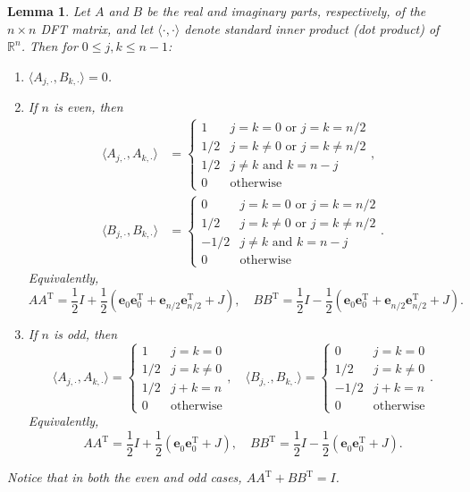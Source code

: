 \documentclass[12pt]{book}
\newcommand{\trans}{\mathrm{T}}	%
\newtheorem{lemma}{Lemma}[section]
\begin{document}
\begin{lemma}
\label{lem:Inner products}
Let $A$ and $B$ be the real and imaginary parts, respectively, of the $n \times n$ DFT matrix, and let $\langle\cdot,\cdot\rangle$ denote standard inner product (dot product) of $\mathbb{R}^n$. Then for $0 \leq j,k \leq n-1$:
\begin{enumerate}[label=(\roman*)]
\item $\langle A_{j,\cdot}, B_{k,\cdot}\rangle = 0$.
\item If $n$ is even, then 
\begin{align*}
\langle A_{j,\cdot}, A_{k,\cdot}\rangle &= \begin{cases}
1 & j = k = 0 \text{ or } j = k = n/2 \\ 
1/2 & j = k \neq 0 \text{ or } j = k \neq n/2 \\ 
1/2 & j \neq k \text{ and } k = n - j \\ 
0 & \text{otherwise} \end{cases}, \\
\langle B_{j,\cdot}, B_{k,\cdot}\rangle &= \begin{cases}
0 & j = k = 0 \text{ or } j = k = n/2 \\ 
1/2 & j = k \neq 0 \text{ or } j = k \neq n/2 \\ 
-1/2 &  j \neq k \text{ and } k = n - j \\ 
0 & \text{otherwise} \end{cases}.
\end{align*}
Equivalently,
\[AA^\trans = \frac{1}{2}I + \frac{1}{2}\left(\bm{e}_0^{}\bm{e}_0^\trans + \bm{e}_{n/2}^{}\bm{e}_{n/2}^\trans + J\right), \quad BB^\trans = \frac{1}{2}I - \frac{1}{2}\left(\bm{e}_0^{}\bm{e}_0^\trans + \bm{e}_{n/2}^{}\bm{e}_{n/2}^\trans + J\right).\]
\item If $n$ is odd, then
\[\langle A_{j,\cdot}, A_{k,\cdot}\rangle = \begin{cases}
1 & j = k = 0 \\ 
1/2 & j = k \neq 0 \\
1/2 & j+k = n \\
0 & \text{otherwise} \end{cases}, \quad 
\langle B_{j,\cdot}, B_{k,\cdot}\rangle = \begin{cases}
0 & j = k = 0 \\ 
1/2 & j = k \neq 0 \\
-1/2 & j+k = n \\
0 & \text{otherwise} \end{cases}.\]
Equivalently,
\[AA^\trans = \frac{1}{2}I + \frac{1}{2}\left(\bm{e}_0^{}\bm{e}_0^\trans + J\right), \quad BB^\trans = \frac{1}{2}I - \frac{1}{2}\left(\bm{e}_0^{}\bm{e}_0^\trans + J\right).\]
\end{enumerate}
Notice that in both the even and odd cases, $AA^\trans + BB^\trans = I$.
\end{lemma}
\end{document}
